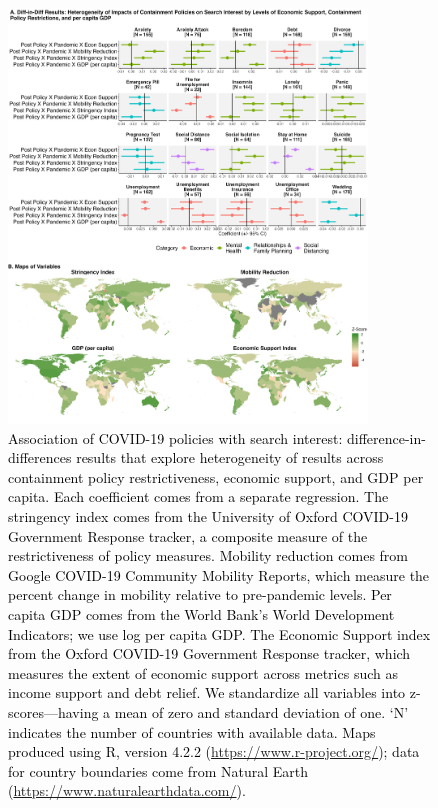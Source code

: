 \documentclass{article}
\begin{document}
\begin{figure}[H]
    \centering
    \includegraphics[width=0.85\textwidth]{figures/did_interact_map_180.png}
    \caption{\textcolor{black}{Association of COVID-19 policies with search interest: difference-in-differences results that explore heterogeneity of results across containment policy restrictiveness, economic support, and GDP per capita. Each coefficient comes from a separate regression. The stringency index comes from the University of Oxford COVID-19 Government Response tracker, a composite measure of the restrictiveness of policy measures. Mobility reduction comes from Google COVID-19 Community Mobility Reports, which measure the percent change in mobility relative to pre-pandemic levels. Per capita GDP comes from the World Bank's World Development Indicators; we use log per capita GDP. The Economic Support index from the Oxford COVID-19 Government Response tracker, which measures the extent of economic support across metrics such as income support and debt relief. We standardize all variables into z-scores---having a mean of zero and standard deviation of one. `N' indicates the number of countries with available data. Maps produced using R, version 4.2.2 (\url{https://www.r-project.org/}); data for country boundaries come from Natural Earth (\url{https://www.naturalearthdata.com/}).}}
    \label{fig:did_interact_map_180}
\end{figure}
\end{document}

